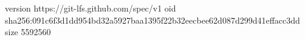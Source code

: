version https://git-lfs.github.com/spec/v1
oid sha256:091c6f3d1dd954bd32a5927baa1395f22b32eecbee62d087d299d41effacc3dd
size 5592560
